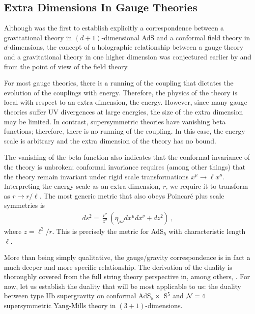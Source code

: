 \documentclass[../PhD.tex]{subfiles}
\begin{document}

\subsection{Extra Dimensions In Gauge Theories}
\label{ssec: extra dims in gauge theories}

Although \cite{hep-th/9711200} was the first to establish explicitly a correspondence between a gravitational theory in $(d+1)$-dimensional AdS and a conformal field theory in $d$-dimensions, the concept of a holographic relationship between a gauge theory and a gravitational theory in one higher dimension was conjectured earlier by \cite{gr-qc/9310026} and \cite{hep-th/9409089} from the point of view of the field theory. 

For most gauge theories, there is a running of the coupling that dictates the evolution of the couplings with energy. Therefore, the physics of the theory is local with respect to an extra dimension, the energy. However, since many gauge theories suffer UV divergences at large energies, the size of the extra dimension may be limited. In contrast, supersymmetric theories have vanishing beta functions; therefore, there is no running of the coupling. In this case, the energy scale is arbitrary and the extra dimension of the theory has no bound.

The vanishing of the beta function also indicates that the conformal invariance of the theory is unbroken; conformal invariance requires (among other things) that the theory remain invariant under rigid scale transformations $x^\mu \to \ell x^\mu$. Interpreting the energy scale as an extra dimension, $r$, we require it to transform as $r \to r/ \ell$. The most generic metric that also obeys Poincar\'e plus scale symmetries is
\begin{align}
\label{Poincare ads}
ds^2 = \frac{\ell^2}{z^2} \left( \eta_{\mu \nu}dx^\mu dx^\nu +dz^2 \right) \, ,
\end{align}
where $z = \ell^2 / r$. This is precisely the metric for AdS$_5$ with characteristic length $\ell$. 

More than being simply qualitative, the gauge/gravity correspondence is in fact a much deeper and more specific relationship. The derivation of the duality is thoroughly covered from the full string theory perspective in, among others, \cite{hep-th/9711200, gr-qc/0602037, 1501.00007, hep-th/9902131, hep-th/9905111}. For now, let us establish the duality that will be most applicable to us: the duality between type IIb supergravity on conformal AdS$_5 \times$ S$^5$ and $\mathcal N = 4$ supersymmetric Yang-Mills theory in $(3+1)$-dimensions.
\end{document}
